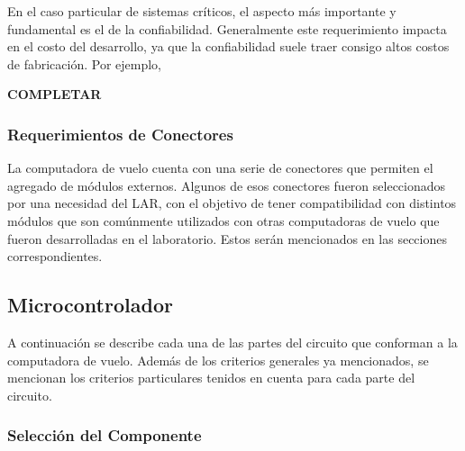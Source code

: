 En el caso particular de sistemas críticos, el aspecto más importante y fundamental es el de la confiabilidad. Generalmente este requerimiento impacta en el costo del desarrollo, ya que la confiabilidad suele traer consigo altos costos de fabricación. Por ejemplo, %


\textbf{{\color{red} COMPLETAR}}

\subsubsection{Requerimientos de Conectores}

La computadora de vuelo cuenta con una serie de conectores que permiten el agregado de módulos externos. Algunos de esos conectores fueron seleccionados por una necesidad del LAR, con el objetivo de tener compatibilidad con distintos módulos que son comúnmente utilizados con otras computadoras de vuelo que fueron desarrolladas en el laboratorio. Estos serán mencionados en las secciones correspondientes.

\subsection{Microcontrolador}


A continuación se describe cada una de las partes del circuito que conforman a la computadora de vuelo. Además de los criterios generales ya mencionados, se mencionan los criterios particulares tenidos en cuenta para cada parte del circuito.

\subsubsection{Selección del Componente}

